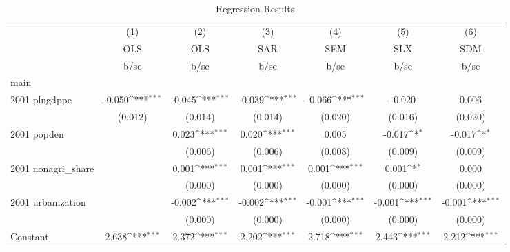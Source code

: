 \begin{table}[htbp]\centering
\def\sym#1{\ifmmode^{#1}\else\(^{#1}\)\fi}
\caption{Regression Results}
\begin{tabular}{l*{6}{c}}
\hline\hline
                    &\multicolumn{1}{c}{(1)}&\multicolumn{1}{c}{(2)}&\multicolumn{1}{c}{(3)}&\multicolumn{1}{c}{(4)}&\multicolumn{1}{c}{(5)}&\multicolumn{1}{c}{(6)}\\
                    &\multicolumn{1}{c}{OLS}&\multicolumn{1}{c}{OLS}&\multicolumn{1}{c}{SAR}&\multicolumn{1}{c}{SEM}&\multicolumn{1}{c}{SLX}&\multicolumn{1}{c}{SDM}\\
                    &        b/se         &        b/se         &        b/se         &        b/se         &        b/se         &        b/se         \\
\hline
main                &                     &                     &                     &                     &                     &                     \\
2001 plngdppc       &      -0.050\sym{***}&      -0.045\sym{***}&      -0.039\sym{***}&      -0.066\sym{***}&      -0.020         &       0.006         \\
                    &     (0.012)         &     (0.014)         &     (0.014)         &     (0.020)         &     (0.016)         &     (0.020)         \\
2001 popden         &                     &       0.023\sym{***}&       0.020\sym{***}&       0.005         &      -0.017\sym{*}  &      -0.017\sym{*}  \\
                    &                     &     (0.006)         &     (0.006)         &     (0.008)         &     (0.009)         &     (0.009)         \\
2001 nonagri\_share  &                     &       0.001\sym{***}&       0.001\sym{***}&       0.001\sym{***}&       0.001\sym{*}  &       0.000         \\
                    &                     &     (0.000)         &     (0.000)         &     (0.000)         &     (0.000)         &     (0.000)         \\
2001 urbanization   &                     &      -0.002\sym{***}&      -0.002\sym{***}&      -0.001\sym{***}&      -0.001\sym{***}&      -0.001\sym{***}\\
                    &                     &     (0.000)         &     (0.000)         &     (0.000)         &     (0.000)         &     (0.000)         \\
Constant            &       2.638\sym{***}&       2.372\sym{***}&       2.202\sym{***}&       2.718\sym{***}&       2.443\sym{***}&       2.212\sym{***}\\

\end{tabular}
\end{table}
